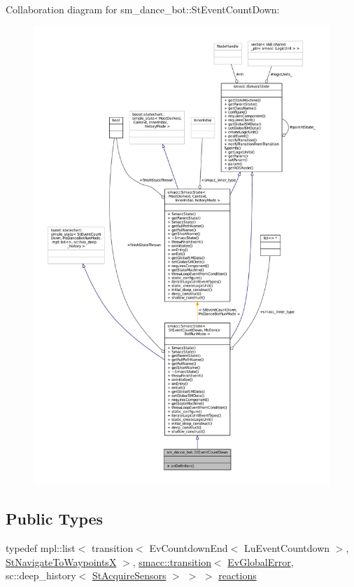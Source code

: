 Collaboration diagram for sm\+\_\+dance\+\_\+bot\+:\+:St\+Event\+Count\+Down\+:
\nopagebreak
\begin{figure}[H]
\begin{center}
\leavevmode
\includegraphics[width=350pt]{structsm__dance__bot_1_1StEventCountDown__coll__graph}
\end{center}
\end{figure}
\subsection*{Public Types}
\begin{DoxyCompactItemize}
\item 
typedef mpl\+::list$<$ transition$<$ Ev\+Countdown\+End$<$ Lu\+Event\+Countdown $>$, \hyperlink{structsm__dance__bot_1_1StNavigateToWaypointsX}{St\+Navigate\+To\+WaypointsX} $>$, \hyperlink{classsmacc_1_1transition}{smacc\+::transition}$<$ \hyperlink{structsm__dance__bot_1_1EvGlobalError}{Ev\+Global\+Error}, sc\+::deep\+\_\+history$<$ \hyperlink{structsm__dance__bot_1_1StAcquireSensors}{St\+Acquire\+Sensors} $>$ $>$ $>$ \hyperlink{structsm__dance__bot_1_1StEventCountDown_a1dda165c92b9e4dfb9f3bf4e5db4c90d}{reactions}
\end{DoxyCompactItemize}
